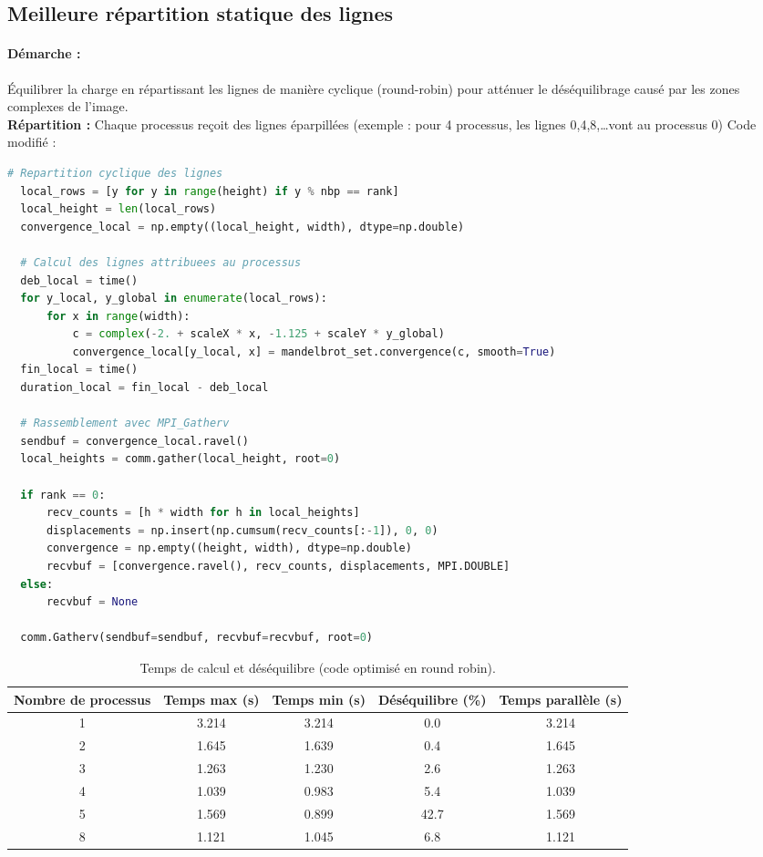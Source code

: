 \documentclass[a4paper,13pt]{book}
\begin{document}
\subsection{Meilleure répartition statique des lignes}
\paragraph{Démarche : }Équilibrer la charge en répartissant les lignes de manière cyclique (round-robin) pour atténuer le déséquilibrage causé par les zones complexes de l’image.\\
\textbf{Répartition : }Chaque processus reçoit des lignes éparpillées (exemple : pour 4 processus, les lignes 0,4,8,\dots vont au processus 0)
Code modifié :
\begin{lstlisting}[language=python]
  # Repartition cyclique des lignes
  local_rows = [y for y in range(height) if y % nbp == rank]
  local_height = len(local_rows)
  convergence_local = np.empty((local_height, width), dtype=np.double)
  
  # Calcul des lignes attribuees au processus
  deb_local = time()
  for y_local, y_global in enumerate(local_rows):
      for x in range(width):
          c = complex(-2. + scaleX * x, -1.125 + scaleY * y_global)
          convergence_local[y_local, x] = mandelbrot_set.convergence(c, smooth=True)
  fin_local = time()
  duration_local = fin_local - deb_local
  
  # Rassemblement avec MPI_Gatherv
  sendbuf = convergence_local.ravel()
  local_heights = comm.gather(local_height, root=0)
  
  if rank == 0:
      recv_counts = [h * width for h in local_heights]
      displacements = np.insert(np.cumsum(recv_counts[:-1]), 0, 0)
      convergence = np.empty((height, width), dtype=np.double)
      recvbuf = [convergence.ravel(), recv_counts, displacements, MPI.DOUBLE]
  else:
      recvbuf = None
  
  comm.Gatherv(sendbuf=sendbuf, recvbuf=recvbuf, root=0)
\end{lstlisting}
\begin{table}[ht]
  \centering
  \caption{Temps de calcul et déséquilibre (code optimisé en round robin).}
  \label{tab:temps_roundrobin}
  \begin{tabular}{@{}ccccc@{}}
    \toprule
    \textbf{Nombre de processus} & \textbf{Temps max (s)} & \textbf{Temps min (s)} & \textbf{Déséquilibre (\%)} & \textbf{Temps parallèle (s)} \\
    \midrule
    1 & 3.214 & 3.214 & 0.0  & 3.214 \\
    2 & 1.645 & 1.639 & 0.4  & 1.645 \\
    3 & 1.263 & 1.230 & 2.6  & 1.263 \\
    4 & 1.039 & 0.983 & 5.4  & 1.039 \\
    5 & 1.569 & 0.899 & 42.7 & 1.569 \\
    8 & 1.121 & 1.045 & 6.8  & 1.121 \\
    \bottomrule
  \end{tabular}
\end{table}
\end{document}
